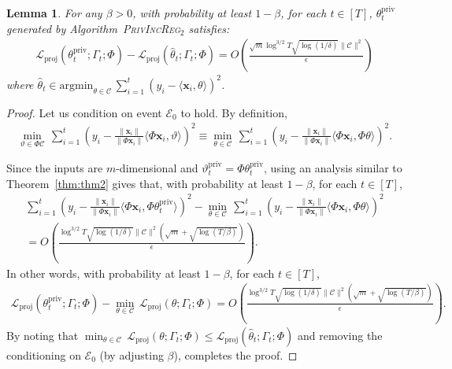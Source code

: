 \documentclass{article}
\theoremstyle{plain}
\newtheorem{lemma}[theorem]{Lemma}
\def \ProjPrivIncReg {\textsc{PrivIncReg$_2$}\xspace}
\def \eps {\epsilon}
\def \CCC {\mathcal{C}}
\def \EEE {\mathcal{E}}
\def \XXX {\mathcal{X}}
\def \LLL {\mathcal{L}}
\def \priv {{\mathrm{priv}}}
\def \proj {{\mathrm{proj}}}
\def \x {\mathbf x}
\begin{document}
\begin{lemma} \label{lem:JLzeroth}
For any $\beta > 0$, with probability at least $1 - \beta$, for each $t \in [T]$, $\theta^\priv_t$ generated by Algorithm~\ProjPrivIncReg satisfies:
\begin{align*}
\LLL_\proj(\theta^\priv_t;\Gamma_t;\Phi) - \LLL_\proj(\hat{\theta}_t;\Gamma_t;\Phi) = O \left (\frac{\sqrt{m} \log^{3/2} T \sqrt{\log(1/\delta)} \| \CCC \|^2}{\eps} \right )
\end{align*}
where $\hat{\theta}_t \in \mbox{argmin}_{\theta \in \CCC}\, \sum_{i=1}^t (y_i - \langle \x_i,\theta \rangle)^2$.
\end{lemma}
\begin{proof}
Let us condition on event $\EEE_0$ to hold. By definition,
\begin{align*}\min_{\vartheta \in \Phi\CCC}\, \sum_{i=1}^t \left (y_i - \frac{\| \x_i \|}{\| \Phi \x_i \|} \langle \Phi \x_i, \vartheta \rangle \right )^2 
\equiv \min_{\theta \in \CCC}\,\sum_{i=1}^t \left (y_i - \frac{\| \x_i \|}{\| \Phi \x_i \|} \langle \Phi \x_i, \Phi\theta \rangle \right )^2.
\end{align*}

Since the inputs are $m$-dimensional and $\vartheta^\priv_t = \Phi\theta^\priv_t$, using an analysis similar to Theorem~\ref{thm:thm2} gives that, with probability at least $1-\beta$, for each $t \in [T]$,
\begin{multline*}
\sum_{i=1}^t \left (y_i - \frac{\| \x_i \|}{\| \Phi \x_i \|} \langle \Phi \x_i, \Phi\theta^\priv_t \rangle \right )^2  - \min_{\theta \in \CCC}\,\sum_{i=1}^t \left (y_i - \frac{\| \x_i \|}{\| \Phi \x_i \|} \langle \Phi \x_i, \Phi\theta \rangle \right )^2 \\
=  O \left ( \frac{\log^{3/2} T \sqrt{\log(1/\delta)} \| \CCC \|^2 (\sqrt{m}+\sqrt{\log(T/\beta)})}{\eps}\right ).
\end{multline*}
In other words, with probability at least $1-\beta$, for each $t \in [T]$,
\begin{align*} 
\LLL_\proj(\theta^\priv_t;\Gamma_t;\Phi) -  \min_{\theta \in \CCC}\, \LLL_\proj(\theta;\Gamma_t;\Phi) =  O \left ( \frac{\log^{3/2} T \sqrt{\log(1/\delta)} \| \CCC \|^2 (\sqrt{m}+\sqrt{\log(T/\beta)})}{\eps}\right ).
\end{align*}
By noting that $\min_{\theta \in \CCC}\, \LLL_\proj(\theta;\Gamma_t;\Phi) \leq \LLL_\proj(\hat{\theta}_t;\Gamma_t;\Phi)$ and removing the conditioning on $\EEE_0$ (by adjusting $\beta$), completes the proof.
\end{proof}
\end{document}
